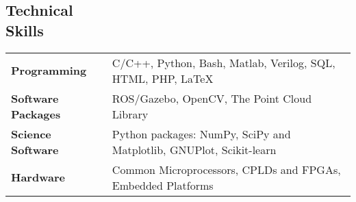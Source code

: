 \documentclass[margin,line]{res}
\begin{document}
\begin{resume}
\section{\sc Technical \\Skills} 
\begin{tabular}{@{}p{1.3in}p{4.3in}}
\textbf{Programming} & C/C++, Python, Bash, Matlab, Verilog, SQL, HTML, PHP, \LaTeX \\  
\vspace*{-0.06in}
\textbf{Software Packages} & 
\vspace*{-0.06in}
ROS/Gazebo, OpenCV, The Point Cloud Library \\ 
\vspace*{-0.06in}
\textbf{Science Software} &
\vspace*{-0.06in}
Python packages: NumPy, SciPy and Matplotlib, GNUPlot, Scikit-learn \\
\vspace*{-0.06in}
\textbf{Hardware} &
\vspace*{-0.06in}
Common Microprocessors, CPLDs and FPGAs, Embedded Platforms \\  
\end{tabular}
%
%
\end{resume}
\end{document}
